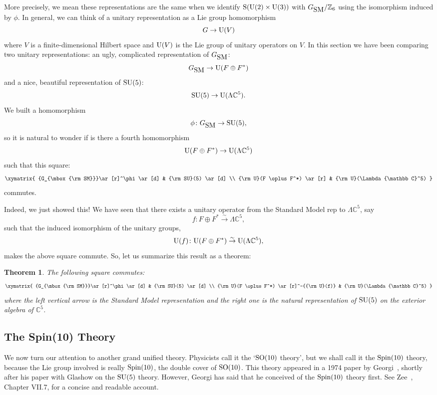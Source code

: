\documentclass{article}
\newcommand{\maps}{\colon}    %
\newcommand{\C}{{\mathbb C}}  %
\newcommand{\Z}{{\mathbb Z}}  %
\newcommand{\U}{{\rm U}}    %
\renewcommand{\S}{{\rm S}}    %
\newcommand{\SO}{{\rm SO}}    %
\newcommand{\SU}{{\rm SU}}    %
\newcommand{\Spin}{{\rm Spin}}    %
\newcommand{\Ex}{\Lambda} %
\newcommand{\GSM}{{G_{\mbox{\rm SM}}}}  %
\newcommand{\et}{\hspace{-0.08in}{\bf .}\hspace{0.1in}}
\newtheorem{thm}{Theorem}
\begin{document}
More precisely, we mean these representations are the same when we 
identify $\S(\U(2) \times \U(3))$ with $\GSM/\Z_6$ using the isomorphism 
induced by $\phi$. In general,
we can think of a unitary representation as a Lie group homomorphism
\[ G \to \U(V) \]
where $V$ is a finite-dimensional Hilbert space and $\U(V)$ is the 
Lie group of unitary operators on $V$.  
In this section we have been comparing two unitary representations:
an ugly, complicated representation of $\GSM$:
\[ \GSM \to \U(F \oplus F^*) \]
and a nice, beautiful representation of $\SU(5)$:
\[ \SU(5) \to \U(\Ex \C^5). \]
We built a homomorphism
\[ \phi \maps \GSM \to \SU(5), \]
so it is natural to wonder if is there a fourth homomorphism
\[ \U(F \oplus F^*) \to \U(\Ex \C^5) \]
such that this square:
\[
\xymatrix{
\GSM \ar[r]^\phi \ar[d] & \SU(5) \ar[d] \\
\U(F \oplus F^*) \ar[r] & \U(\Ex \C^5)
} 
\]
commutes.

Indeed, we just showed this!  We have seen that there exists a
unitary operator from the Standard Model rep to $\Ex \C^5$, say
\[ f \maps F \oplus F^* \stackrel{\sim}{\to} \Ex \C^5 , \]
such that the induced isomorphism of the unitary groups, 
\[ \U(f) \maps \U(F \oplus F^*) \stackrel{\sim}{\to} \U(\Ex \C^5), \] 
makes the above square commute.  So, let us summarize this result as a theorem:

\begin{thm}\et
\label{thm:su(5)}
	The following square commutes:
	\[
	\xymatrix{
	\GSM \ar[r]^\phi \ar[d] & \SU(5) \ar[d] \\
	\U(F \oplus F^*) \ar[r]^-{\U(f)} & \U(\Ex \C^5)
	}
	\]
where the left vertical arrow is the Standard Model representation
and the right one is the natural representation of $\SU(5)$ on
the exterior algebra of $\C^5$.
\end{thm}

\subsection{The Spin(10) Theory} \label{sec:so(10)}

We now turn our attention to another grand unified theory.  Physicists
call it the `$\SO(10)$ theory', but we shall call it the
$\Spin(10)$ theory, because the Lie group involved is really
$\Spin(10)$, the double cover of $\SO(10)$.  This theory appeared in a 
1974 paper by Georgi~\cite{georgi:so(10)}, shortly after his paper with
Glashow on the $\SU(5)$ theory.  However, Georgi has said that he conceived 
of the $\Spin(10)$ theory first.  See Zee~\cite{zee:nutshell}, Chapter VII.7, 
for a concise and readable account. 
\end{document}
